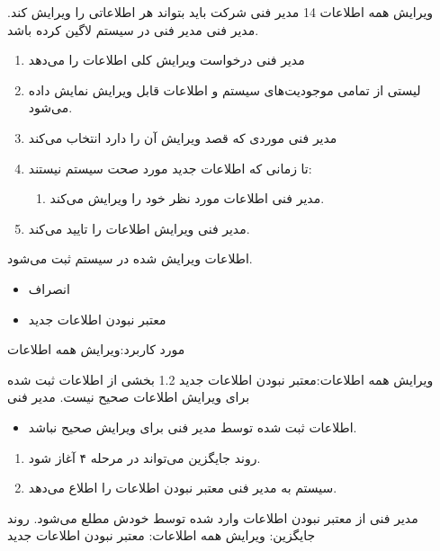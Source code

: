 {
	\usecase
	{ویرایش همه اطلاعات}
	{14}
	{مدیر فنی شرکت باید بتواند هر اطلاعاتی را ویرایش کند.}
	{مدیر فنی}
	{}
	{مدیر فنی در سیستم لاگین کرده باشد.}
	{
		\vspace*{-0.6cm}
		\begin{enumerate}
			\item مدیر فنی درخواست ویرایش کلی اطلاعات را می‌دهد
			\item لیستی از تمامی موجودیت‌های سیستم و اطلاعات قابل ویرایش نمایش داده می‌شود.
			
			\item مدیر فنی موردی که قصد ویرایش آن را دارد انتخاب می‌کند
			
			\item تا زمانی که اطلاعات جدید مورد صحت سیستم نیستند:
			\begin{enumerate}[label=\theenumi.\arabic*.]
				\item مدیر فنی اطلاعات مورد نظر خود را ویرایش می‌کند.
			\end{enumerate}
			\item 
			مدیر فنی ویرایش اطلاعات را تایید می‌کند.
			
		\end{enumerate}
	}
	{اطلاعات ویرایش شده در سیستم ثبت می‌شود.}
	{
		\begin{itemize}
			\item
			انصراف
			\item 
			معتبر نبودن اطلاعات جدید
		\end{itemize}
	}
	{
		مورد کاربرد:ویرایش همه اطلاعات
	}
}

	
	
	\alternativeflow
	{
		ویرایش همه اطلاعات:معتبر نبودن اطلاعات جدید
	}
	{1.2}
	{
		بخشی از اطلاعات ثبت شده برای ویرایش اطلاعات صحیح نیست.
	}
	{
		مدیر فنی
	}
	{}
	{
		\begin{itemize}
			\vspace*{-0.6cm}
			\item 
			اطلاعات ثبت شده توسط مدیر فنی برای ویرایش صحیح نباشد.
		
		\end{itemize}
	}
	{
		\vspace*{-0.6cm}
		\begin{enumerate}
			\item 
			روند جایگزین می‌تواند در مرحله ۴ آغاز شود.
			\item
			سیستم به مدیر فنی معتبر نبودن اطلاعات را اطلاع می‌دهد.
		\end{enumerate}
	}
	{
		مدیر فنی از معتبر نبودن اطلاعات وارد شده توسط خودش مطلع می‌شود.
	}
	{
		روند جایگزین: ویرایش همه اطلاعات: معتبر نبودن اطلاعات جدید
	}


